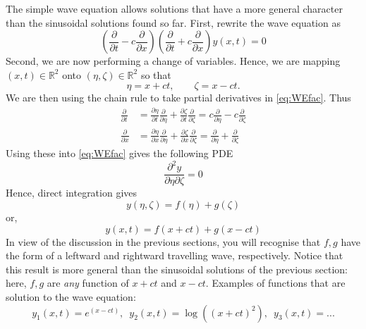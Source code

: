 \documentclass[11pt,twoside,a4paper,english]{book}
\begin{document}
The simple wave equation allows solutions that have a more general character than the sinusoidal solutions found so far. First, rewrite the wave equation as
\begin{equation}\label{eq:WEfac}
\left( \frac{\partial}{\partial t} - c  \frac{\partial}{\partial x}\right)\left( \frac{\partial}{\partial t} + c  \frac{\partial}{\partial x}\right) y(x,t) = 0
\end{equation}
Second, we are now performing a change of variables. Hence, we are mapping $(x,t) \in \mathbb{R}^2$ onto $(\eta,\zeta) \in \mathbb{R}^2$ so that
\begin{equation}
\eta = x + ct, \qquad  \zeta = x - ct.
\end{equation}
We are then using the chain rule to take partial derivatives in \eqref{eq:WEfac}. Thus
\begin{subequations}
\begin{align}
\frac{\partial}{\partial t} &= \frac{\partial \eta}{\partial t}\frac{\partial }{\partial \eta} + \frac{\partial \zeta}{\partial t}\frac{\partial }{\partial \zeta} = c \frac{\partial }{\partial \eta} - c \frac{\partial }{\partial \zeta} \\
\frac{\partial}{\partial x} &= \frac{\partial \eta}{\partial x}\frac{\partial }{\partial \eta} + \frac{\partial \zeta}{\partial x}\frac{\partial }{\partial \zeta} = \frac{\partial }{\partial \eta} + \frac{\partial }{\partial \zeta} 
\end{align}
\end{subequations}
Using these into \eqref{eq:WEfac} gives the following PDE 
\begin{equation}
\frac{\partial^2y}{\partial \eta \partial \zeta}  = 0
\end{equation}
Hence, direct integration gives
\begin{equation}
y(\eta,\zeta) = f(\eta) + g(\zeta) 
\end{equation}
or,
\begin{equation}\label{eq:Dalem}
y(x,t) = f(x+ct) + g(x-ct)
\end{equation}
In view of the discussion in the previous sections, you will recognise that $f,g$ have the form of a leftward and rightward travelling wave, respectively. Notice that this result is more general than the sinusoidal solutions of the previous section: here, $f,g$ are \emph{any} function of $x+ct$ and $x-ct$. Examples of functions that are solution to the wave equation:
\begin{equation}\label{eq:WEsolsEx}
y_1(x,t) = e^{(x-ct)}, \,\,\, y_2(x,t) = \log \left( (x+ct)^2 \right), \,\,\, y_3(x,t) =  ...
\end{equation}
\end{document}
